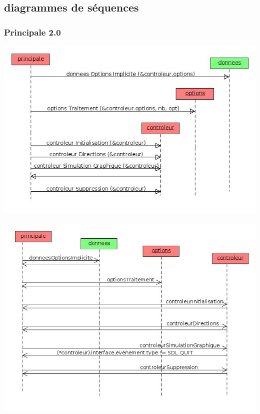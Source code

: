 \subsection{diagrammes de séquences}
%
%
\subsubsection{Principale 2.0}
\includegraphics[width=.95\textwidth]{./illustration/sequenceInitialisationPrincipale}

\vspace{.91cm}
\includegraphics[width=.95\textwidth]{./illustration/sequencePrincipale2}
%
